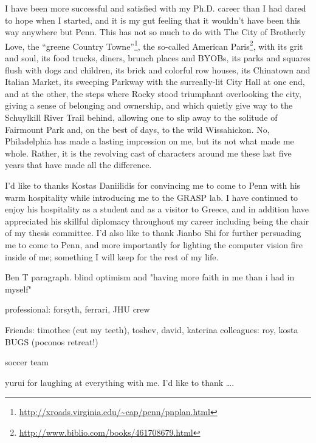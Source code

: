 I have been more successful and satisfied with my Ph.D. career than I had dared 
to hope when I started, and it is my gut feeling that it wouldn’t have been 
this way anywhere but Penn.  This has not so much to do with The City of 
Brotherly Love, the ``greene Country 
Towne''\footnote{\url{http://xroads.virginia.edu/~cap/penn/pnplan.html}}, the 
so-called American 
Paris\footnote{\url{http://www.biblio.com/books/461708679.html}}, with its grit 
and soul, its food trucks, diners, brunch places and BYOBs, its parks and 
squares flush with dogs and children, its brick and colorful row houses, its 
Chinatown and Italian Market,  its sweeping Parkway with the surreally-lit City 
Hall at one end, and at the other, the steps where Rocky stood triumphant 
overlooking the city, giving a sense of belonging and ownership, and which 
quietly give way to the Schuylkill River Trail behind, allowing one to slip 
away to the solitude of Fairmount Park and, on the best of days, to the wild 
Wissahickon.  No, Philadelphia has made a lasting impression on me, but its not 
what made me whole.  Rather, it is the revolving cast of characters around me 
these last five years that have made all the difference.


I'd like to thanks Kostas Daniilidis for convincing me to come to Penn with his 
warm hospitality while introducing me to the GRASP lab.  I have continued to 
enjoy his hospitality as a student and as a visitor to Greece, and in addition 
have appreciated his skillful diplomacy throughout my career including being 
the chair of my thesis committee.  I'd also like to thank Jianbo Shi for 
further persuading me to come to Penn, and more importantly for lighting the 
computer vision fire inside of me; something I will keep for the rest of my 
life.

Ben T paragraph. blind optimism and "having more faith in me than i had in 
myself"

professional: forsyth, ferrari, JHU crew

Friends: timothee (cut my teeth), toshev, david, katerina
colleagues: roy, kosta
BUGS (poconos retreat!)

soccer team

yurui for laughing at everything with me.
I'd like to thank \ldots.

